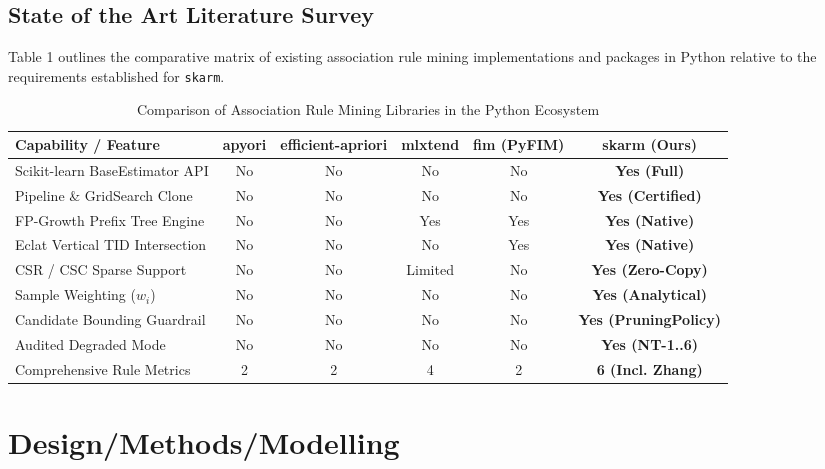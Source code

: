 \documentclass[11pt,a4paper]{article}
\newcommand{\toprule}{\hline\hline}
\newcommand{\midrule}{\hline}
\newcommand{\bottomrule}{\hline\hline}
\begin{document}
\subsection{State of the Art Literature Survey}
Table 1 outlines the comparative matrix of existing association rule mining implementations and packages in Python relative to the requirements established for \texttt{skarm}.

\begin{table}[!ht]
\centering
\caption{Comparison of Association Rule Mining Libraries in the Python Ecosystem}
\vspace{0.2em}
\footnotesize
\begin{tabular}{lccccc}
\toprule
\textbf{Capability / Feature} & \textbf{apyori} & \textbf{efficient-apriori} & \textbf{mlxtend} & \textbf{fim (PyFIM)} & \textbf{skarm (Ours)} \\
\midrule
Scikit-learn BaseEstimator API & No & No & No & No & \textbf{Yes (Full)} \\
Pipeline \& GridSearch Clone & No & No & No & No & \textbf{Yes (Certified)} \\
FP-Growth Prefix Tree Engine & No & No & Yes & Yes & \textbf{Yes (Native)} \\
Eclat Vertical TID Intersection & No & No & No & Yes & \textbf{Yes (Native)} \\
CSR / CSC Sparse Support & No & No & Limited & No & \textbf{Yes (Zero-Copy)} \\
Sample Weighting ($w_i$) & No & No & No & No & \textbf{Yes (Analytical)} \\
Candidate Bounding Guardrail & No & No & No & No & \textbf{Yes (PruningPolicy)} \\
Audited Degraded Mode & No & No & No & No & \textbf{Yes (NT-1..6)} \\
Comprehensive Rule Metrics & 2 & 2 & 4 & 2 & \textbf{6 (Incl. Zhang)} \\
\bottomrule
\end{tabular}
\end{table}

\vspace{0.7em}

\section{Design/Methods/Modelling}
\end{document}
